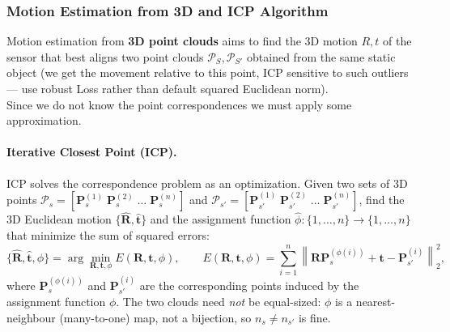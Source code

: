 \documentclass{article}
\begin{document}
\subsubsection{Motion Estimation from 3D and ICP Algorithm}
Motion estimation from \textbf{3D point clouds} aims to find the 3D motion $R,t$ of the sensor that best aligns two point clouds $\mathcal{P}_S, \mathcal{P}_{S'}$ obtained from the same static object (we get the movement relative to this point, ICP sensitive to such outliers --- use robust Loss rather than default squared Euclidean norm).\\
Since we do not know the point correspondences we must apply some approximation. 

\paragraph{Iterative Closest Point (ICP).}
ICP solves the correspondence problem as an optimization. Given two sets of 3D points $\mathcal{P}_s = [\mathbf{P}_s^{(1)}\;\mathbf{P}_s^{(2)}\;\dots\;\mathbf{P}_s^{(n)}]$ and $\mathcal{P}_{s'} = [\mathbf{P}_{s'}^{(1)}\;\mathbf{P}_{s'}^{(2)}\;\dots\;\mathbf{P}_{s'}^{(n)}]$, find the 3D Euclidean motion $\{\hat{\mathbf{R}}, \hat{\mathbf{t}}\}$ and the assignment function $\hat\phi: \{1,\dots,n\}\to\{1,\dots,n\}$ that minimize the sum of squared errors:
$$
\{\hat{\mathbf{R}}, \hat{\mathbf{t}}, \hat\phi\} = \arg\min_{\mathbf{R},\mathbf{t},\phi} E(\mathbf{R},\mathbf{t},\phi), \qquad E(\mathbf{R},\mathbf{t},\phi) = \sum_{i=1}^{n} \left\| \mathbf{R}\mathbf{P}_s^{(\phi(i))} + \mathbf{t} - \mathbf{P}_{s'}^{(i)} \right\|_2^2,
$$
where $\mathbf{P}_s^{(\phi(i))}$ and $\mathbf{P}_{s'}^{(i)}$ are the corresponding points induced by the assignment function $\phi$. The two clouds need \textit{not} be equal-sized: $\phi$ is a nearest-neighbour (many-to-one) map, not a bijection, so $n_s \neq n_{s'}$ is fine.
\end{document}
